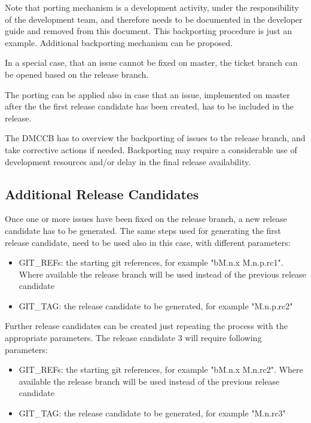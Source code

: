 Note that porting mechanism is a development activity, under the responsibility of the development team, and therefore needs to be documented in the developer guide and removed from this document.
This backporting procedure is just an example. Additional backporting mechanism can be proposed.

In a special case, that an issue cannot be fixed on master, the ticket branch can be opened based on the release branch.

The porting can be applied also in case that an issue, implemented on master after the the first release candidate has been created, has to be included in the release.

The DMCCB has to overview the backporting of issues to the release branch, and take corrective actions if needed. Backporting may require a considerable use of development resources and/or delay in the final release availability.


\subsection{Additional Release Candidates} \label{sec:newrc}

Once one or more issues have been fixed on the release branch, a new release candidate has to be generated. %
The same steps used for generating the first release candidate, need to be used also in this case, with different parameters:

\begin{itemize}
\item GIT\_REFs: the starting git references, for example "bM.n.x M.n.p.rc1". Where available the release branch will be used instead of the previous release candidate
\item GIT\_TAG: the release candidate to be generated, for example "M.n.p.rc2"
\end{itemize}

Further release candidates can be created just repeating the process with the appropriate parameters.
The release candidate 3 will require following parameters:

\begin{itemize}
\item GIT\_REFs: the starting git references, for example "bM.n.x M.n.rc2". Where available the release branch will be used instead of the previous release candidate
\item GIT\_TAG: the release candidate to be generated, for example "M.n.rc3"
\end{itemize}

